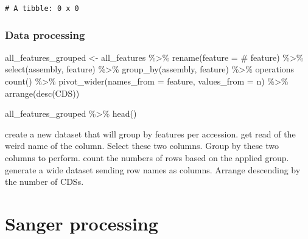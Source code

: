 \documentclass[
  letterpaper,
  DIV=11,
  numbers=noendperiod]{scrreprt}
\newenvironment{Shaded}{\begin{snugshade}}{\end{snugshade}}
\newcommand{\AttributeTok}[1]{\textcolor[rgb]{0.40,0.46,0.14}{#1}}
\newcommand{\FunctionTok}[1]{\textcolor[rgb]{0.28,0.35,0.67}{#1}}
\newcommand{\NormalTok}[1]{\textcolor[rgb]{0.00,0.46,0.62}{#1}}
\newcommand{\OtherTok}[1]{\textcolor[rgb]{0.00,0.46,0.62}{#1}}
\newcommand{\SpecialCharTok}[1]{\textcolor[rgb]{0.37,0.37,0.37}{#1}}
\newcommand{\StringTok}[1]{\textcolor[rgb]{0.13,0.47,0.30}{#1}}
\begin{document}
\begin{verbatim}
# A tibble: 0 x 0
\end{verbatim}

\hypertarget{data-processing}{%
\subsection*{Data processing}\label{data-processing}}

\begin{Shaded}
\begin{Highlighting}[]
\NormalTok{all\_features\_grouped }\OtherTok{\textless{}{-}}\NormalTok{ all\_features }\SpecialCharTok{\%\textgreater{}\%} 
  \FunctionTok{rename}\NormalTok{(}\AttributeTok{feature =} \StringTok{\textasciigrave{}}\AttributeTok{\# feature}\StringTok{\textasciigrave{}}\NormalTok{) }\SpecialCharTok{\%\textgreater{}\%} 
  \FunctionTok{select}\NormalTok{(assembly, feature) }\SpecialCharTok{\%\textgreater{}\%} 
  \FunctionTok{group\_by}\NormalTok{(assembly, feature) }\SpecialCharTok{\%\textgreater{}\%}\NormalTok{  operations}
  \FunctionTok{count}\NormalTok{() }\SpecialCharTok{\%\textgreater{}\%} 
  \FunctionTok{pivot\_wider}\NormalTok{(}\AttributeTok{names\_from =}\NormalTok{ feature, }\AttributeTok{values\_from =}\NormalTok{ n) }\SpecialCharTok{\%\textgreater{}\%} 
  \FunctionTok{arrange}\NormalTok{(}\FunctionTok{desc}\NormalTok{(CDS))}
    
\NormalTok{all\_features\_grouped }\SpecialCharTok{\%\textgreater{}\%} 
  \FunctionTok{head}\NormalTok{()}
\end{Highlighting}
\end{Shaded}

create a new dataset that will group by features per accession. get read
of the weird name of the column. Select these two columns. Group by
these two columns to perform. count the numbers of rows based on the
applied group. generate a wide dataset sending row names as columns.
Arrange descending by the number of CDSs.

\hypertarget{sanger-processing}{%
\chapter{Sanger processing}\label{sanger-processing}}
\end{document}
